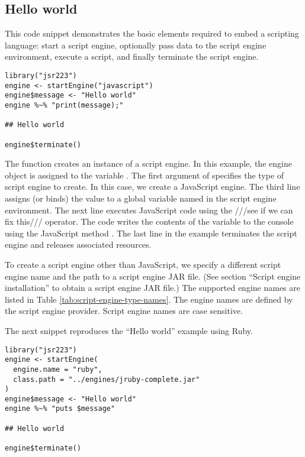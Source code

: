 \subsection{Hello world}

This code snippet demonstrates the basic elements required to embed a scripting language: start a script engine, optionally pass data to the script engine environment, execute a script, and finally terminate the script engine.

\begin{verbatim}
library("jsr223")
engine <- startEngine("javascript")
engine$message <- "Hello world"
engine %~% "print(message);"

## Hello world

engine$terminate()
\end{verbatim}

The  function creates an instance of a script engine. In this example, the engine object is assigned to the variable . The first argument of  specifies the type of script engine to create. In this case, we create a JavaScript engine. The third line assigns (or binds) the value  to a global variable named  in the script engine environment. The next line executes JavaScript code using the ///see if we can fix this/// \code{\%$\sim$\%} operator. The code writes the contents of the variable  to the console using the JavaScript method . The last line in the example terminates the script engine and releases associated resources.

To create a script engine other than JavaScript, we specify a different script engine name and the path to a script engine JAR file. (See section “Script engine installation” to obtain a script engine JAR file.) The supported engine names are listed in Table \ref{tab:script-engine-type-names}. The engine names are defined by the script engine provider.  Script engine names are case sensitive.

The next snippet reproduces the “Hello world” example using Ruby.

\begin{verbatim}
library("jsr223")
engine <- startEngine(
  engine.name = "ruby",
  class.path = "../engines/jruby-complete.jar"
)
engine$message <- "Hello world"
engine %~% "puts $message"

## Hello world

engine$terminate()
\end{verbatim}

